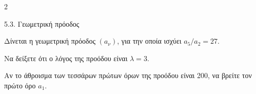 \begin{ylh}{2}
    \item 5.3. Γεωμετρική πρόοδος
\end{ylh}
Δίνεται η γεωμετρική πρόοδος $(a_\nu)$, για την οποία ισχύει $a_5/a_2 = 27$.

\begin{alist}
\item Να δείξετε ότι ο λόγος της προόδου είναι $\lambda = 3$. 
\item Αν το άθροισμα των τεσσάρων πρώτων όρων της προόδου είναι 200, να βρείτε τον πρώτο όρο $a_1$. 
\end{alist}

